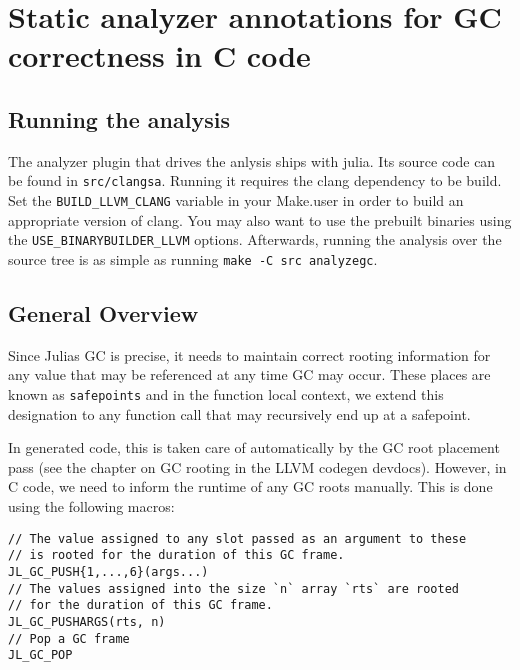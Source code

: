 \hypertarget{3374914057216712271}{}


\section{Static analyzer annotations for GC correctness in C code}



\hypertarget{10926948174874297988}{}


\subsection{Running the analysis}



The analyzer plugin that drives the anlysis ships with julia. Its source code can be found in \texttt{src/clangsa}. Running it requires the clang dependency to be build. Set the \texttt{BUILD\_LLVM\_CLANG} variable in your Make.user in order to build an appropriate version of clang. You may also want to use the prebuilt binaries using the \texttt{USE\_BINARYBUILDER\_LLVM} options. Afterwards, running the analysis over the source tree is as simple as running \texttt{make -C src analyzegc}.



\hypertarget{9968293705752668266}{}


\subsection{General Overview}



Since Julia{\textquotesingle}s GC is precise, it needs to maintain correct rooting information for any value that may be referenced at any time GC may occur. These places are known as \texttt{safepoints} and in the function local context, we extend this designation to any function call that may recursively end up at a safepoint.



In generated code, this is taken care of automatically by the GC root placement pass (see the chapter on GC rooting in the LLVM codegen devdocs). However, in C code, we need to inform the runtime of any GC roots manually. This is done using the following macros:




\begin{lstlisting}
// The value assigned to any slot passed as an argument to these
// is rooted for the duration of this GC frame.
JL_GC_PUSH{1,...,6}(args...)
// The values assigned into the size `n` array `rts` are rooted
// for the duration of this GC frame.
JL_GC_PUSHARGS(rts, n)
// Pop a GC frame
JL_GC_POP
\end{lstlisting}



